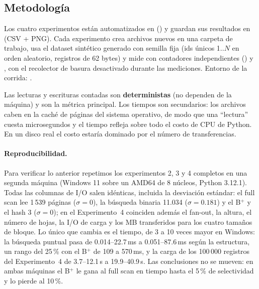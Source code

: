
\subsection{Metodología}

Los cuatro experimentos están automatizados en  ()
y guardan sus resultados en  (CSV + PNG). Cada experimento crea archivos nuevos
en una carpeta de trabajo, usa el dataset sintético  generado con semilla fija
(ids únicos 1..$N$ en orden aleatorio, registros de 62 bytes) y mide con contadores independientes
() y , con el recolector de basura desactivado durante las
mediciones. Entorno de la corrida: .

Las lecturas y escrituras contadas son \textbf{deterministas} (no dependen de la máquina) y son la métrica
principal. Los tiempos son secundarios: los archivos caben en la caché de páginas del sistema operativo,
de modo que una ``lectura'' cuesta microsegundos y el tiempo refleja sobre todo el costo de CPU de
Python. En un disco real el costo estaría dominado por el número de transferencias.

\paragraph{Reproducibilidad.} Para verificar lo anterior repetimos los experimentos 2, 3 y 4 completos en
una segunda máquina (Windows 11 sobre un AMD64 de 8 núcleos, Python 3.12.1). Todas las columnas de I/O
salen idénticas, incluida la desviación estándar: el full scan lee 1\,539 páginas ($\sigma = 0$), la
búsqueda binaria 11.034 ($\sigma = 0.181$) y el B$^+$ y el hash 3 ($\sigma = 0$); en el Experimento~4
coinciden además el fan-out, la altura, el número de hojas, la I/O de carga y los MB transferidos para
los cuatro tamaños de bloque. Lo único que cambia es el tiempo, de 3 a 10 veces mayor en Windows: la
búsqueda puntual pasa de 0.014--22.7\,ms a 0.051--87.6\,ms según la estructura, un rango del 25\,\% con
el B$^+$ de 109 a 570\,ms, y la carga de los 100\,000 registros del Experimento~4 de 3.7--12.1\,s a
19.9--40.9\,s. Las conclusiones no se mueven: en ambas máquinas el B$^+$ le gana al full scan en tiempo
hasta el 5\,\% de selectividad y lo pierde al 10\,\%.


